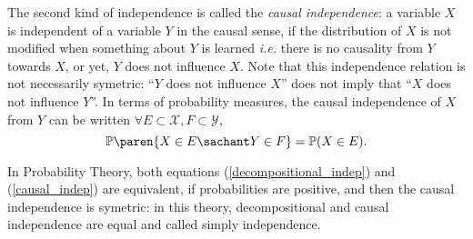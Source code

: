 The second kind of independence is called 
the \textit{causal independence}:
a variable $X$ is independent of a variable $Y$
in the causal sense, 
if the distribution of $X$ 
is not modified 
when something about $Y$ is learned
\textit{i.e.} there is no causality from $Y$ 
towards $X$, or yet, $Y$ does not influence $X$.
Note that this independence relation is not necessarily symetric:
``$Y$ does not influence $X$'' does not imply that 
``$X$ does not influence $Y$''.
In terms of probability measures,
the causal independence of $X$ from $Y$ can be written 
$\forall E \subset \mathcal{X}, F \subset \mathcal{Y}$,
\begin{equation}
\label{causal_indep}
\mathbb{P} \paren{ X \in E \sachant Y \in F } = \mathbb{P} ( X \in E ).
\end{equation}

In Probability Theory, both equations (\ref{decompositional_indep}) and (\ref{causal_indep})
are equivalent, if probabilities are positive, 
and then the causal independence is symetric: 
in this theory, decompositional and causal independence are equal
and called simply independence.

